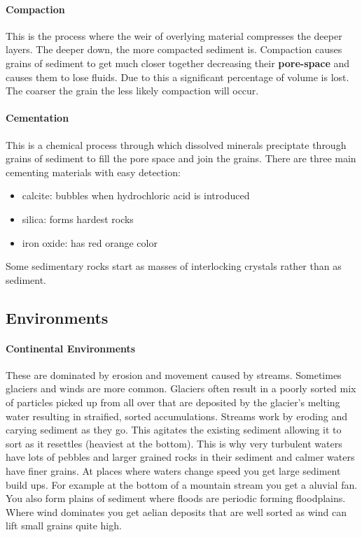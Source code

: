 \documentclass{article}
\begin{document}
\paragraph{Compaction} %
\label{par:compaction}
This is the process where the weir of overlying material compresses the deeper layers. The deeper down, the more compacted sediment is. Compaction causes grains of sediment to get much closer together decreasing their \textbf{pore-space} and causes them to lose fluids. Due to this a significant percentage of volume is lost. The coarser the grain the less likely compaction will occur.

\paragraph{Cementation} %
\label{par:cementation}
This is a chemical process through which dissolved minerals preciptate through grains of sediment to fill the pore space and join the grains.
There are three main cementing materials with easy detection:
\begin{itemize}
    \item calcite: bubbles when hydrochloric acid is introduced
    \item silica: forms hardest rocks
    \item iron oxide: has red orange color
\end{itemize}

Some sedimentary rocks start as masses of interlocking crystals rather than as sediment.
\subsection*{Environments} %
\label{sub:environments}
\paragraph{Continental Environments} %
 \label{par:continental_environments}
 These are dominated by erosion and movement caused by streams. Sometimes glaciers and winds are more common. Glaciers often result in a poorly sorted mix of particles picked up from all over that are deposited by the glacier's melting water resulting in straified, sorted accumulations. Streams work by eroding and carying sediment as they go. This agitates the existing sediment allowing it to sort as it resettles (heaviest at the bottom). This is why very turbulent waters have lots of pebbles and larger grained rocks in their sediment and calmer waters have finer grains. At places where waters change speed you get large sediment build ups. For example at the bottom of a mountain stream you get a aluvial fan. You also form plains of sediment where floods are periodic forming floodplains. Where wind dominates you get aelian deposits that are well sorted as wind can lift small grains quite high.
\end{document}
